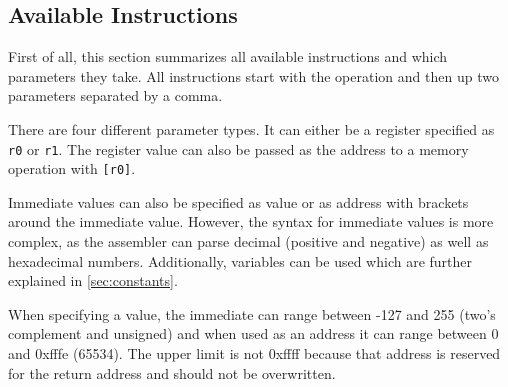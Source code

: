 \subsection{Available Instructions}
First of all, this section summarizes all available instructions and which parameters they take.
All instructions start with the operation and then up two parameters separated by a comma.

There are four different parameter types.
It can either be a register specified as \texttt{r0} or \texttt{r1}.
The register value can also be passed as the address to a memory operation with \texttt{[r0]}.

Immediate values can also be specified as value or as address with brackets around the immediate value.
However, the syntax for immediate values is more complex, as the assembler can parse decimal (positive and negative) as well as hexadecimal numbers.
Additionally, variables can be used which are further explained in \cref{sec:constants}.

When specifying a value, the immediate can range between -127 and 255 (two's complement and unsigned) and when used as an address it can range between 0 and 0xfffe (65534). The upper limit is not 0xffff because that address is reserved for the return address and should not be overwritten.

